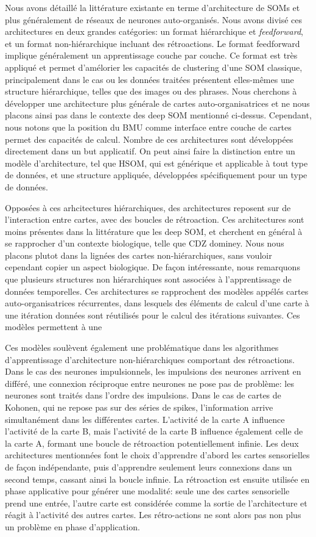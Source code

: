\documentclass[../main]{subfiles}
\begin{document}
Nous avons détaillé la littérature existante en terme d'architecture de SOMs et plus généralement de réseaux de neurones auto-organisés. Nous avons divisé ces architectures en deux grandes catégories: un format hiérarchique et \emph{feedforward}, et un format non-hiérarchique incluant des rétroactions.
Le format feedforward implique généralement un apprentissage couche par couche. Ce format est très appliqué et permet d'amélorier les capacités de clustering d'une SOM classique, principalement dans le cas ou les données traitées présentent elles-mêmes une structure hiérarchique, telles que des images ou des phrases.
Nous cherchons à développer une architecture plus générale de cartes auto-organisatrices et ne nous placons ainsi pas dans le contexte des deep SOM mentionné ci-dessus. 
Cependant, nous notons que la position du BMU comme interface entre couche de cartes permet des capacités de calcul.
Nombre de ces architectures sont développées directement dans un but applicatif. On peut ainsi faire la distinction entre un modèle d'architecture, tel que HSOM, qui est générique et applicable à tout type de données, et une structure appliquée, développées spécifiquement pour un type de données.

Opposées à ces arhcitectures hiérarchiques, des architectures reposent sur de l'interaction entre cartes, avec des boucles de rétroaction.
Ces architectures sont moins présentes dans la littérature que les deep SOM, et cherchent en général à se rapprocher d'un contexte biologique, telle que CDZ dominey.
Nous nous placons plutot dans la lignées des cartes non-hiérarchiques, sans vouloir cependant copier un aspect biologique.
De façon intéressante, nous remarquons que plusieurs structures non hiérarchiques sont associées à l'apprentissage de données temporelles. Ces architectures se rapprochent des modèles appélés cartes auto-organisatrices récurrentes, dans lesquels des éléments de calcul d'une carte à une itération données sont réutilisés pour le calcul des itérations suivantes. Ces modèles permettent à une 

Ces modèles soulèvent également une problématique dans les algorithmes d'apprentissage d'architecture non-hiérarchiques comportant des rétroactions. Dans le cas des neurones impulsionnels, les impulsions des neurones arrivent en différé, une connexion réciproque entre neurones ne pose pas de problème: les neurones sont traités dans l'ordre des impulsions. Dans le cas de cartes de Kohonen, qui ne repose pas sur des séries de spikes, l'information arrive simultanément dans les différentes cartes. L'activité de la carte A influence l'activité de la carte B, mais l'activité de la carte B influence également celle de la carte A, formant une boucle de rétroaction potentiellement infinie. Les deux architectures mentionnées font le choix d'apprendre d'abord les cartes sensorielles de façon indépendante, puis d'apprendre seulement leurs connexions dans un second temps, cassant ainsi la boucle infinie. 
La rétroaction est ensuite utilisée en phase applicative pour générer une modalité: seule une des cartes sensorielle prend une entrée, l'autre carte est considérée comme la sortie de l'architecture et réagit à l'activité des autres cartes. Les rétro-actions ne sont alors pas non plus un problème en phase d'application.
\end{document}
